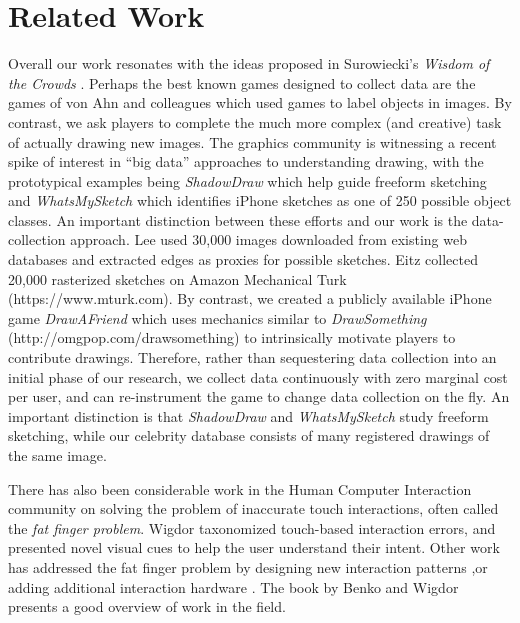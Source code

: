 \section{Related Work}

Overall our work resonates with the ideas proposed in Surowiecki's \emph{Wisdom of the Crowds} . Perhaps the best known games designed to collect data are the games of von Ahn and colleagues  which used games to label objects in images. By contrast, we ask players to complete the much more complex (and creative) task of actually drawing new images. The graphics community is witnessing a recent spike of interest in ``big data'' approaches to understanding drawing, with the prototypical examples being \emph{ShadowDraw} \cite{Lee:2011} which help guide freeform sketching and \emph{WhatsMySketch} \cite{Eitz:2012:HSO} which identifies iPhone sketches as one of 250 possible object classes. An important distinction between these efforts and our work is the data-collection approach. Lee \etal used 30,000 images downloaded from existing web databases and extracted edges as proxies for possible sketches. Eitz \etal collected 20,000 rasterized sketches on Amazon Mechanical Turk (https://www.mturk.com). By contrast, we created a publicly available iPhone game \emph{DrawAFriend} which uses mechanics similar to \emph{DrawSomething} (http://omgpop.com/drawsomething) to intrinsically motivate players to contribute drawings. Therefore, rather than sequestering data collection into an initial phase of our research, we collect data continuously with zero marginal cost per user, and can re-instrument the game to change data collection on the fly. An important distinction is that \emph{ShadowDraw} and \emph{WhatsMySketch} study freeform sketching, while our celebrity database consists of many registered drawings of the same image.

There has also been considerable work in the Human Computer Interaction community on solving the problem of inaccurate touch interactions, often called the \emph{fat finger problem}. Wigdor \etal {} taxonomized touch-based interaction errors, and presented novel visual cues to help the user understand their intent. Other work has addressed the fat finger problem by designing new interaction patterns \cite{Albinsson:2003:HPT,Benko:2006:PST,Forlines06hybridpointing,Vogel07shift:a},or adding additional interaction hardware \cite{Scott:2010:RTE,Wigdor:2006:UTI,Wigdor:2007:LTS}. The book by Benko and Wigdor  presents a good overview of work in the field.

